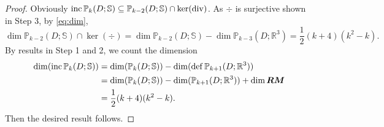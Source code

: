 \begin{proof}
\medskip


\medskip


Obviously $\operatorname{inc}\mathbb P_{k}(D;\mathbb S)\subseteq\mathbb P_{k-2}(D;\mathbb S)\cap\ker(\operatorname{div})$. 
As $\div$ is surjective shown in Step 3, by \eqref{eq:dim},
$$
\dim\mathbb P_{k-2}(D;\mathbb S)\cap\ker(\div)=\dim\mathbb P_{k-2}(D;\mathbb S)-\dim\mathbb P_{k-3}(D;\mathbb R^3)=\frac{1}{2}(k+4)(k^2-k).
$$
By results in Step 1 and 2, we count the dimension
\begin{align*}
\dim (\operatorname{inc} \mathbb P_{k}(D; \mathbb S)) &= \dim (\mathbb P_{k}(D; \mathbb S)) - \dim (\operatorname{def} \mathbb P_{k+1}(D; \mathbb R^3)) \\
&= \dim (\mathbb P_{k}(D; \mathbb S)) - \dim (\mathbb P_{k+1}(D; \mathbb R^3)) + \dim \boldsymbol{RM} \\
& = \frac{1}{2}(k+4)(k^2-k).
\end{align*}
%
%
Then the desired result follows. 
\end{proof}

